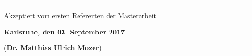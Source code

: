 \vspace*{\fill}


\textcolor{grund}{\rule{1.0\textwidth}{0.6pt}}

\vspace*{0.75em}

Akzeptiert vom ersten Referenten der Masterarbeit.

\textbf{Karlsruhe, den 03. September 2017} %

\vspace*{4em}

\dotfill \hspace*{8cm} 

\hspace*{0.82cm}(\textbf{Dr. Matthias Ulrich Mozer})